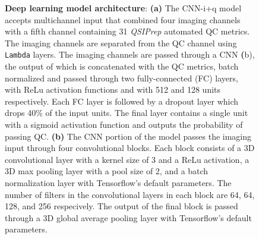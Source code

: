\documentclass[fleqn,10pt]{wlscirep}
\begin{document}
\begin{figure}[tbp]
\begin{subfigure}[t]{0.4\textwidth}
    \end{subfigure}
    \caption{%
        {\bf Deep learning model architecture}:
        \textbf{(a)} The CNN-i+q model accepts multichannel input that combined
        four imaging channels with a fifth channel containing 31 \emph{QSIPrep}
        automated QC metrics.  The imaging channels are separated from the QC
        channel using \texttt{Lambda} layers. The imaging channels are passed
        through a CNN \textbf(b), the output of which is concatenated with the
        QC metrics, batch normalized and passed through two fully-connected (FC)
        layers, with ReLu activation functions and with 512 and 128 units
        respectively. Each FC layer is followed by a dropout layer which drops
        40\% of the input units. The final layer contains a single unit with a
        sigmoid activation function and outputs the probability of passing QC.
        \textbf{(b)} The CNN portion of the model passes the imaging input
        through four convolutional blocks. Each block consists of a 3D
        convolutional layer with a kernel size of 3 and a ReLu activation, a 3D
        max pooling layer with a pool size of 2, and a batch normalization layer
        with Tensorflow's default parameters.  The number of filters in the
        convolutional layers in each block are 64, 64, 128, and 256 respecively.
        The output of the final block is passed through a 3D global average
        pooling layer with Tensorflow's default parameters.
    }
    \label{fig:dl-architecture}
\end{figure}
\end{document}
